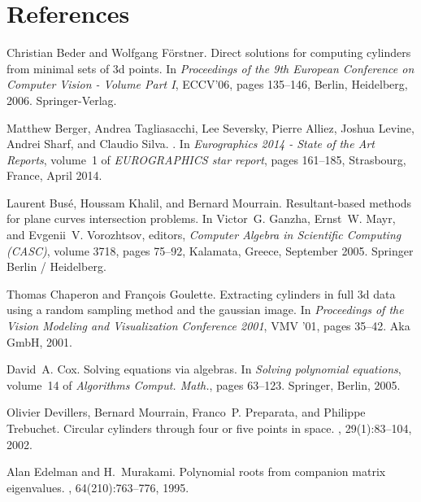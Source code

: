 \documentclass[5p]{elsarticle}
\begin{document}
\section*{References}


\begin{thebibliography}{10}

Christian Beder and Wolfgang F\"{o}rstner.
\newblock Direct solutions for computing cylinders from minimal sets of 3d
  points.
\newblock In {\em Proceedings of the 9th European Conference on Computer Vision
  - Volume Part I}, ECCV'06, pages 135--146, Berlin, Heidelberg, 2006.
  Springer-Verlag.

Matthew Berger, Andrea Tagliasacchi, Lee Seversky, Pierre Alliez, Joshua
  Levine, Andrei Sharf, and Claudio Silva.
.
\newblock In {\em {Eurographics 2014 - State of the Art Reports}}, volume~1 of
  {\em EUROGRAPHICS star report}, pages 161--185, Strasbourg, France, April
  2014.

Laurent Bus{\'e}, Houssam Khalil, and Bernard Mourrain.
\newblock Resultant-based methods for plane curves intersection problems.
\newblock In Victor~G. Ganzha, Ernst~W. Mayr, and Evgenii~V. Vorozhtsov,
  editors, {\em Computer Algebra in Scientific Computing (CASC)}, volume 3718,
  pages 75--92, Kalamata, Greece, September 2005. Springer Berlin / Heidelberg.

Thomas Chaperon and Fran\c{c}ois Goulette.
\newblock Extracting cylinders in full 3d data using a random sampling method
  and the gaussian image.
\newblock In {\em Proceedings of the Vision Modeling and Visualization
  Conference 2001}, VMV '01, pages 35--42. Aka GmbH, 2001.

David~A. Cox.
\newblock Solving equations via algebras.
\newblock In {\em Solving polynomial equations}, volume~14 of {\em Algorithms
  Comput. Math.}, pages 63--123. Springer, Berlin, 2005.

Olivier Devillers, Bernard Mourrain, Franco~P. Preparata, and Philippe
  Trebuchet.
\newblock Circular cylinders through four or five points in space.
, 29(1):83--104, 2002.

Alan Edelman and H.~Murakami.
\newblock Polynomial roots from companion matrix eigenvalues.
, 64(210):763--776, 1995.


\end{thebibliography}
\end{document}
